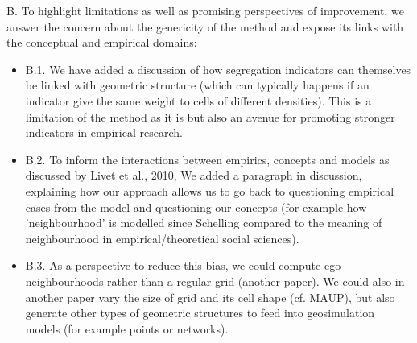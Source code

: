 \documentclass[11pt,a4paper,sans]{moderncv}        %
\begin{document}
 \medskip
B. To highlight limitations as well as promising perspectives of improvement, we answer the concern about the genericity of the method and expose its links with the conceptual and empirical domains:

 \begin{itemize}
 
  \item B.1. We have added a discussion of how segregation indicators can themselves be linked with geometric structure (which can typically happens if an indicator give the same weight to cells of different densities). This is a limitation of the method as it is but also an avenue for promoting stronger indicators in empirical research. %
  
  \item B.2. To inform the interactions between empirics, concepts and models as discussed by Livet et al., 2010, We added a paragraph in discussion, explaining how our approach allows us to go back to questioning empirical cases from the model and questioning our concepts (for example how 'neighbourhood' is modelled since Schelling compared to the meaning of neighbourhood in empirical/theoretical social sciences). 
  
  \item B.3. As a perspective to reduce this bias, we could compute ego-neighbourhoods rather than a regular grid (another paper). We could also in another paper vary the size of grid and its cell shape (cf. MAUP), but also generate other types of geometric structures to feed into geosimulation models (for example points or networks). %
\end{itemize}

\bigskip


 
\end{document}
